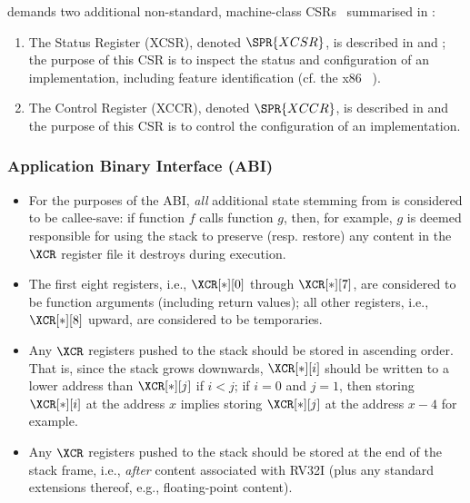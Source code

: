 \XCID 
demands two additional
non-standard, machine-class CSRs~\cite[Section 2]{SCARV:RV:ISA:II:17}
summarised in :

\begin{enumerate}
\item The \XCID Status  Register (XCSR), denoted $\SPR{XCSR}$,
      is described in  and ;
      the purpose of this CSR is to 
      inspect the status and configuration of an \XCID implementation,
      including feature identification
      (cf. the x86 ~\cite[Page 3-190--3-224]{SCARV:X86:2:18}).
\item The \XCID Control Register (XCCR), denoted $\SPR{XCCR}$,
      is described in  and 
      the purpose of this CSR is to 
      control the            configuration of an \XCID implementation.
\end{enumerate}


\subsubsection{Application Binary Interface (ABI)}
\label{sec:spec:state:abi}

\begin{itemize}
\item For the purposes of the ABI, {\em all} additional state stemming from 
      \XCID is considered to be callee-save: if function $f$ calls function
      $g$, then, for example, $g$ is deemed responsible for using the stack
      to preserve (resp. restore) any content in the $\XCR$ register file 
      it destroys during execution.
\item The first eight registers, 
      i.e., $\XCR[*][0]$ through $\XCR[*][7]$, 
      are considered to be function arguments (including return values); 
      all other registers, 
      i.e., $\XCR[*][8]$ upward,
      are considered to be temporaries.
\item Any $\XCR$ registers pushed to the stack should be stored 
      in ascending order.
      That is, since the stack grows downwards, 
      $\XCR[*][i]$
      should be written to a lower address than
      $\XCR[*][j]$
      if $i < j$; if $i = 0$ and $j = 1$, then storing $\XCR[*][i]$ at the
      address $x$ implies storing $\XCR[*][j]$ at the address $x - 4$ for
      example.
\item Any $\XCR$ registers pushed to the stack should be stored 
      at the end of the stack frame, 
      i.e., {\em after} content associated with RV32I (plus any standard 
      extensions thereof, e.g., floating-point content).
\end{itemize}

